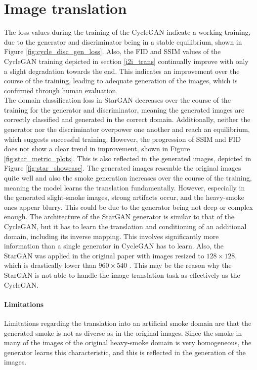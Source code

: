 \section{Image translation}
The loss values during the training of the CycleGAN indicate a working training, due to the generator and discriminator being in a stable equilibrium, shown in Figure \ref{fig:cycle_disc_gen_loss}.
Also, the FID and SSIM values of the CycleGAN training depicted in section \ref{i2i_trans} continually improve with only a slight degradation towards the end.
This indicates an improvement over the course of the training, leading to adequate generation of the images, which is confirmed through human evaluation.\\
The domain classification loss in StarGAN decreases over the course of the training for the generator and discriminator, meaning the generated images are correctly classified and generated in the correct domain.
Additionally, neither the generator nor the discriminator overpower one another and reach an equilibrium, which suggests successful training.%
However, the progression of SSIM and FID does not show a clear trend in improvement, shown in Figure \ref{fig:star_metric_plots}.
This is also reflected in the generated images, depicted in Figure \ref{fig:star_showcase}.
The generated images resemble the original images quite well and also the smoke generation increases over the course of the training, meaning the model learns the translation fundamentally.
However, especially in the generated slight-smoke images, strong artifacts occur, and the heavy-smoke ones appear blurry.
This could be due to the generator being not deep or complex enough.
The architecture of the StarGAN generator is similar to that of the CycleGAN, but it has to learn the translation and conditioning of an additional domain, including its inverse mapping. 
This involves significantly more information than a single generator in CycleGAN has to learn.
Also, the StarGAN was applied in the original paper with images resized to $128\times128$, which is drastically lower than $960\times540$ \cite{choi2018stargan}.
This may be the reason why the StarGAN is not able to handle the image translation task as effectively as the CycleGAN.\\
\paragraph{Limitations} Limitations regarding the translation into an artificial smoke domain are that the generated smoke is not as diverse as in the original images.
Since the smoke in many of the images of the original heavy-smoke domain is very homogeneous, the generator learns this characteristic, and this is reflected in the generation of the images.

